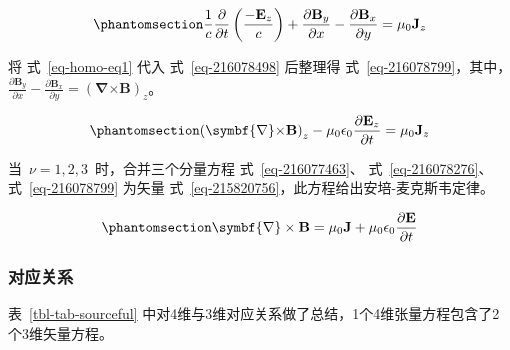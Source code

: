 \documentclass[
  chinese,
  a4paper,
  UTF8,
  12pt,
  oneside,
  openany]{ctexbook}
\begin{document}
\begin{equation}\protect\phantomsection\label{eq-216078498}{
\frac{1}{c}\frac{\partial}{\partial t}\left( \frac{{- \mathbf{E}}_{z}}{c} \right) + \frac{\partial\mathbf{B}_{y}}{\partial x} - \frac{\partial\mathbf{B}_{x}}{\partial y} = \mu_{0}\mathbf{J}_{z}
}\end{equation}

将 式~\ref{eq-homo-eq1} 代入 式~\ref{eq-216078498} 后整理得
式~\ref{eq-216078799}，其中，\(\frac{\partial\mathbf{B}_{y}}{\partial x} - \frac{\partial\mathbf{B}_{x}}{\partial y} = \left( \symbf{\nabla}\mathbf{\times B} \right)_{z}\)。

\begin{equation}\protect\phantomsection\label{eq-216078799}{
\left( \symbf{\nabla}\mathbf{\times B} \right)_{z} - \mu_{0}\epsilon_{0}\frac{\partial\mathbf{E}_{z}}{\partial t} = \mu_{0}\mathbf{J}_{z}
}\end{equation}

当~\(\nu = 1,2,3\)~时，合并三个分量方程 式~\ref{eq-216077463}、
式~\ref{eq-216078276}、 式~\ref{eq-216078799} 为矢量
式~\ref{eq-215820756}，此方程给出安培-麦克斯韦定律。~

\begin{equation}\protect\phantomsection\label{eq-215820756}{
\symbf{\nabla} \times \mathbf{B} = \mu_{0}\mathbf{J} + \mu_{0}\epsilon_{0}\frac{\partial\mathbf{E}}{\partial t}
}\end{equation}

\subsubsection{对应关系}\label{ux5bf9ux5e94ux5173ux7cfb}

表~\ref{tbl-tab-sourceful}
中对4维与3维对应关系做了总结，1个4维张量方程包含了2个3维矢量方程。
\end{document}
